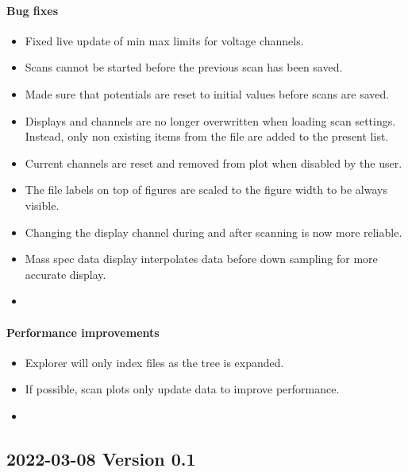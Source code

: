 \documentclass[a4paper,11pt,DIV=13]{scrartcl}
\begin{document}
\paragraph{Bug fixes}
\begin{itemize}
\item Fixed live update of min max limits for voltage channels.
\item Scans cannot be started before the previous scan has been saved.
\item Made sure that potentials are reset to initial values before scans are saved.
\item Displays and channels are no longer overwritten when loading scan settings. Instead, only non existing items from the file are added to the present list.
\item Current channels are reset and removed from plot when disabled by the user.
\item The file labels on top of figures are scaled to the figure width to be always visible.
\item Changing the display channel during and after scanning is now more reliable.
\item Mass spec data display interpolates data before down sampling for more accurate display.
\item 
\end{itemize}

\paragraph{Performance improvements}
\begin{itemize}
\item Explorer will only index files as the tree is expanded.
\item If possible, scan plots only update data to improve performance.
\item 
\end{itemize}

\subsection{2022-03-08 Version 0.1}
\end{document}
